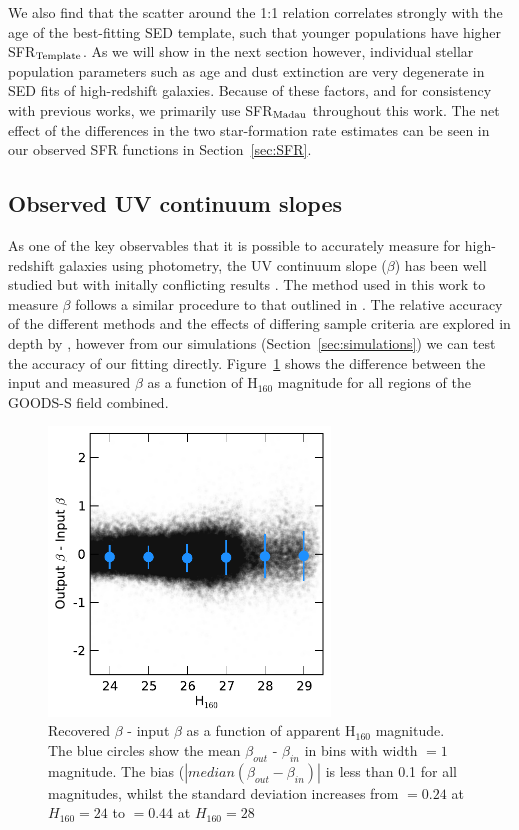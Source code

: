 We also find that the scatter around the 1:1 relation correlates strongly with the age of the best-fitting SED template, such that younger populations have higher SFR$_{\rm{Template}}$. As we will show in the next section however, individual stellar population parameters such as age and dust extinction are very degenerate in SED fits of high-redshift galaxies. Because of these factors, and for consistency with previous works, we primarily use SFR$_{\rm{Madau}}$ throughout this work. The net effect of the differences in the two star-formation rate estimates can be seen in our observed SFR functions in Section~\ref{sec:SFR}.


\subsection{Observed UV continuum slopes}\label{app:beta}
As one of the key observables that it is possible to accurately measure for high-redshift galaxies using photometry, the UV continuum slope ($\beta$) has been well studied but with initally conflicting results \citep{Dunlop:2011jl,Wilkins:2011fs,2012ApJ...754...83B,Finkelstein:2012hr,2013MNRAS.429.2456R,Bouwens:2013vf}. The method used in this work to measure $\beta$ follows a similar procedure to that outlined in \citet{Finkelstein:2012hr}. The relative accuracy of the different methods and the effects of differing sample criteria are explored in depth by \citet{2013MNRAS.429.2456R}, however from our simulations (Section~\ref{sec:simulations}) we can test the accuracy of our fitting directly. Figure~\ref{fig:betacomparison} shows the difference between the input and measured $\beta$ as a function of H$_{160}$ magnitude for all regions of the GOODS-S field combined.  

\begin{figure}
\centering
\includegraphics[width=75mm]{plots/figB1.pdf}
\caption[Recovered $\beta$ - input $\beta$ as a function of apparent H$_{160}$ magnitude.]{Recovered $\beta$ - input $\beta$ as a function of apparent H$_{160}$ magnitude. The blue circles show the mean $\beta_{out}$ - $\beta_{in}$ in bins with width $=1$ magnitude. The bias ($\left | median (\beta_{out}-\beta_{in}) \right |$ is less than 0.1 for all magnitudes, whilst the standard deviation increases from $= 0.24$ at $H_{160} = 24$ to $= 0.44$ at $H_{160} = 28$}
\label{fig:betacomparison}
\end{figure}

